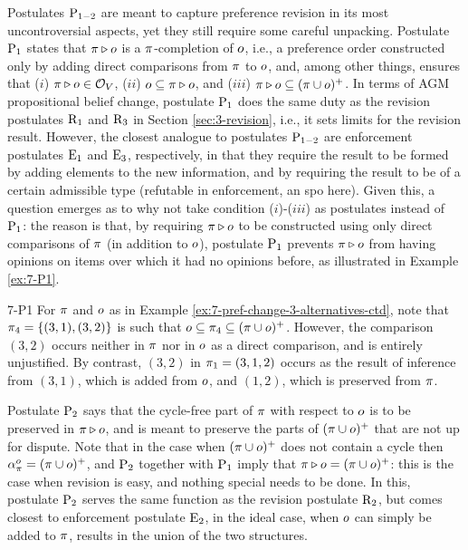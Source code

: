 Postulates $\mathrm{P}_{1-2}$ are meant to capture preference revision in its most uncontroversial aspects,
yet they still require some careful unpacking.
Postulate $\mathrm{P}_{1}$ states that $\pi\triangleright o$ is a $\pi$-completion of $o$,
i.e., a preference order constructed only by adding direct comparisons from $\pi$ to $o$,
and, among other things, ensures that 
($i$) $\pi\triangleright o\in\mathcal{O}_V$, 
($ii$) $o\subseteq\pi\triangleright o$, and
($iii$) $\pi\triangleright o\subseteq(\pi\cup o)^+$. 
In terms of AGM propositional belief change, 
postulate $\mathrm{P}_{1}$ does the same duty as 
the revision postulates $\mathrm{R}_{1}$ and $\mathrm{R}_{3}$
in Section \ref{sec:3-revision},
i.e., it sets limits for the revision result.
However, the closest analogue to postulates $\mathrm{P}_{1-2}$ are 
enforcement postulates $\mathrm{E}_{1}$ and $\mathrm{E}_{3}$, respectively,
in that they require the result to be formed by adding elements to 
the new information, and by requiring the result to be of a certain 
admissible type (refutable in enforcement, an spo here).
Given this, a question emerges as to why not take
condition ($i$)-($iii$) as postulates instead of $\mathrm{P}_{1}$:
the reason is that, by requiring $\pi\triangleright o$ to be constructed using only direct comparisons 
of $\pi$ (in addition to $o$), postulate $\mathrm{P}_{1}$ prevents $\pi\triangleright o$ from having opinions on items
over which it had no opinions before, as illustrated in Example \ref{ex:7-P1}.

\begin{xmpl}{}{7-P1}
	For $\pi$ and $o$ as in 
	Example \ref{ex:7-pref-change-3-alternatives-ctd}, 
	note that $\pi_4 = \{(3,1),(3,2)\}$
	is such that $o\subseteq\pi_4\subseteq(\pi\cup o)^+$. 
	However, the comparison $(3,2)$ occurs neither 
	in $\pi$ nor in $o$ as a direct comparison, 
	and is entirely unjustified. 
	By contrast, $(3,2)$ in $\pi_1=(3,1,2)$ occurs 
	as the result of inference from $(3,1)$, 
	which is added from $o$,
	and $(1,2)$, which is preserved from $\pi$.
\end{xmpl} 

Postulate $\mathrm{P}_{2}$ says that the cycle-free part of $\pi$ with respect to 
$o$ is to be preserved 
in $\pi\triangleright o$, and is meant to preserve the parts of 
$(\pi\cup o)^+$ that are not up for dispute.
Note that in the case when $(\pi\cup o)^+$ 
does not contain a cycle then $\alpha_{\pi}^{o}=(\pi\cup o)^+$,
and $\mathrm{P}_{2}$ together with $\mathrm{P}_{1}$ imply that $\pi\triangleright o=(\pi\cup o)^+$: this is the case
when revision is easy, and nothing special needs to be done. In this, postulate $\mathrm{P}_{2}$
serves the same function as the revision postulate $\mathrm{R}_{2}$,
but comes closest to enforcement postulate $\mathrm{E}_{2}$,
in the ideal case, when $o$ can simply be added to $\pi$, results in 
the union of the two structures.


